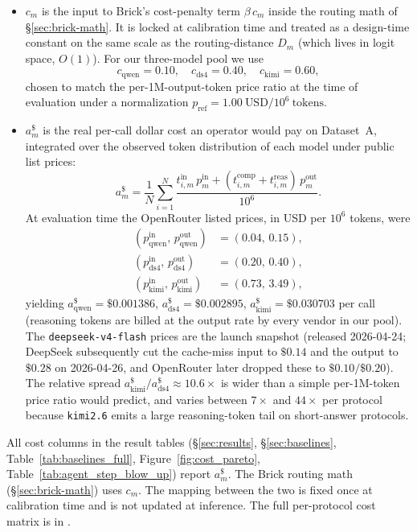 \documentclass[twocolumn,10pt,a4paper]{article}
\begin{document}
\begin{itemize}\setlength{\itemsep}{2pt}
\item $c_m$ is the input to Brick's cost-penalty term $\beta\,c_m$ inside the routing math of §\ref{sec:brick-math}. It is locked at calibration time and treated as a design-time constant on the same scale as the routing-distance $D_m$ (which lives in logit space, $O(1)$). For our three-model pool we use
\[
  c_{\text{qwen}}{=}0.10,\quad c_{\text{ds4}}{=}0.40,\quad c_{\text{kimi}}{=}0.60,
\]
chosen to match the per-1M-output-token price ratio at the time of evaluation under a normalization $p_{\mathrm{ref}}{=}1.00\ \text{USD}/10^6\ \text{tokens}$.
\item $a_m^{\$}$ is the real per-call dollar cost an operator would pay on Dataset~A, integrated over the observed token distribution of each model under public list prices:
\[
  a_m^{\$} = \frac{1}{N}\sum_{i=1}^{N} \frac{t^{\text{in}}_{i,m}\, p^{\text{in}}_m + (t^{\text{comp}}_{i,m} + t^{\text{reas}}_{i,m})\, p^{\text{out}}_m}{10^6}.
\]
At evaluation time the OpenRouter listed prices, in USD per $10^6$ tokens, were
\begin{align*}
  (p^{\text{in}}_{\text{qwen}},\, p^{\text{out}}_{\text{qwen}}) &= (0.04,\, 0.15), \\
  (p^{\text{in}}_{\text{ds4}},\, p^{\text{out}}_{\text{ds4}}) &= (0.20,\, 0.40), \\
  (p^{\text{in}}_{\text{kimi}},\, p^{\text{out}}_{\text{kimi}}) &= (0.73,\, 3.49),
\end{align*}
yielding $a_{\text{qwen}}^{\$}{=}\$0.001386$, $a_{\text{ds4}}^{\$}{=}\$0.002895$, $a_{\text{kimi}}^{\$}{=}\$0.030703$ per call (reasoning tokens are billed at the output rate by every vendor in our pool). The \texttt{deepseek-v4-flash} prices are the launch snapshot (released 2026-04-24; DeepSeek subsequently cut the cache-miss input to $\$0.14$ and the output to $\$0.28$ on 2026-04-26, and OpenRouter later dropped these to $\$0.10/\$0.20$). The relative spread $a_{\text{kimi}}^{\$}/a_{\text{ds4}}^{\$}\approx 10.6{\times}$ is wider than a simple per-1M-token price ratio would predict, and varies between $7{\times}$ and $44{\times}$ per protocol because \texttt{kimi2.6} emits a large reasoning-token tail on short-answer protocols.
\end{itemize}

All cost columns in the result tables (§\ref{sec:results}, §\ref{sec:baselines}, Table~\ref{tab:baselines_full}, Figure~\ref{fig:cost_pareto}, Table~\ref{tab:agent_step_blow_up}) report $a_m^{\$}$. The Brick routing math (§\ref{sec:brick-math}) uses $c_m$. The mapping between the two is fixed once at calibration time and is not updated at inference. The full per-protocol cost matrix is in .
\end{document}
